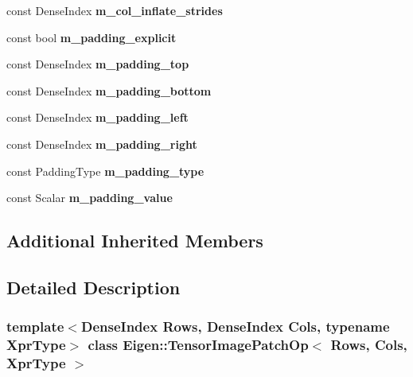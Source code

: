 \begin{DoxyCompactItemize}
const Dense\+Index {\bfseries m\+\_\+col\+\_\+inflate\+\_\+strides}
\item 
\mbox{\label{class_eigen_1_1_tensor_image_patch_op_ae5a8ef556004d6bc88a6ce68e8221c09}} 
const bool {\bfseries m\+\_\+padding\+\_\+explicit}
\item 
\mbox{\label{class_eigen_1_1_tensor_image_patch_op_ad28eb263a5636b605885c621ebe41909}} 
const Dense\+Index {\bfseries m\+\_\+padding\+\_\+top}
\item 
\mbox{\label{class_eigen_1_1_tensor_image_patch_op_a1ea7a677d8bc06bee98280e8cd9e3448}} 
const Dense\+Index {\bfseries m\+\_\+padding\+\_\+bottom}
\item 
\mbox{\label{class_eigen_1_1_tensor_image_patch_op_a5cc213d791fd14397aa6a099a757b94d}} 
const Dense\+Index {\bfseries m\+\_\+padding\+\_\+left}
\item 
\mbox{\label{class_eigen_1_1_tensor_image_patch_op_a4839096556aa25241b87eb4a2aa228b7}} 
const Dense\+Index {\bfseries m\+\_\+padding\+\_\+right}
\item 
\mbox{\label{class_eigen_1_1_tensor_image_patch_op_ab0be3a4db56cc2e4b2b50ce2d27a0b8f}} 
const Padding\+Type {\bfseries m\+\_\+padding\+\_\+type}
\item 
\mbox{\label{class_eigen_1_1_tensor_image_patch_op_a2e418cdd0ba53da2ae94499b73ce3d5a}} 
const Scalar {\bfseries m\+\_\+padding\+\_\+value}
\end{DoxyCompactItemize}
\subsection*{Additional Inherited Members}


\subsection{Detailed Description}
\subsubsection*{template$<$Dense\+Index Rows, Dense\+Index Cols, typename Xpr\+Type$>$\newline
class Eigen\+::\+Tensor\+Image\+Patch\+Op$<$ Rows, Cols, Xpr\+Type $>$}



